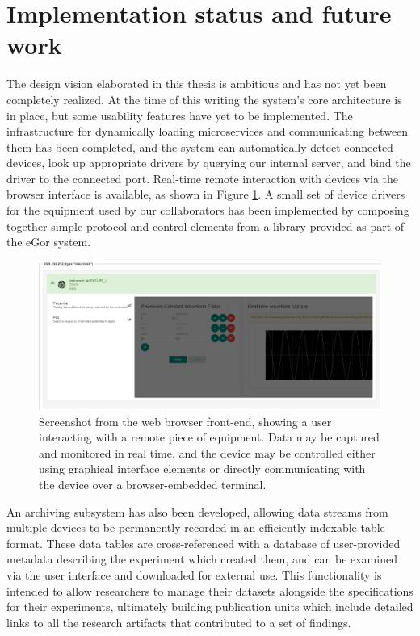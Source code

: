 \documentclass[../thesis]{subfiles}
\begin{document}
\section{Implementation status and future work}
The design vision elaborated in this thesis is ambitious and has not
yet been completely realized. At the time of this writing the system's
core architecture is in place, but some usability features have yet to
be implemented. The infrastructure for dynamically loading
microservices and communicating between them has been completed, and
the system can automatically detect connected devices, look up
appropriate drivers by querying our internal server, and bind the
driver to the connected port. Real-time remote interaction with
devices via the browser interface is available, as shown in Figure
\ref{fig:browser-interface}. A small set of device drivers for the
equipment used by our collaborators has been implemented by composing
together simple protocol and control elements from a library provided
as part of the eGor system.

\begin{figure}
  \includegraphics[width=\textwidth]{images/control-panels}
  \caption{
    Screenshot from the web browser front-end, showing a user
    interacting with a remote piece of equipment. Data may be captured
    and monitored in real time, and the device may be controlled
    either using graphical interface elements or directly
    communicating with the device over a browser-embedded terminal.
    \label{fig:browser-interface}
  }
\end{figure}

An archiving subsystem has also been developed, allowing data streams
from multiple devices to be permanently recorded in an efficiently
indexable table format. These data tables are cross-referenced with a
database of user-provided metadata describing the experiment which
created them, and can be examined via the user interface and
downloaded for external use. This functionality is intended to allow
researchers to manage their datasets alongside the specifications for
their experiments, ultimately building publication units which include
detailed links to all the research artifacts that contributed to a set
of findings.
\end{document}
